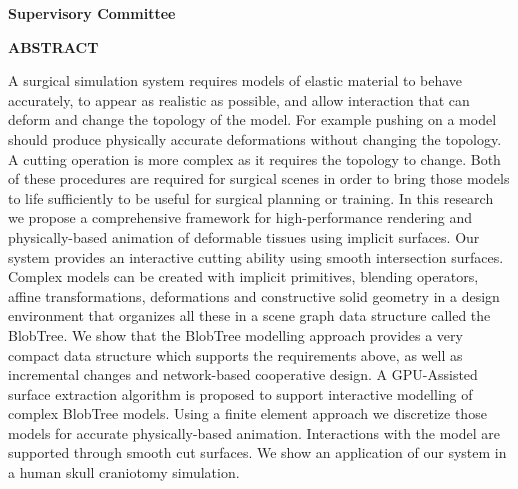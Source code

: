 \pagebreak
\newpage
{}

\noindent \textbf{Supervisory Committee}
\tpbreak
\panel

\begin{center}
\textbf{ABSTRACT}
\end{center}
A surgical simulation system requires models of elastic material to behave 
accurately, to appear as realistic as possible, and allow interaction that can 
deform and change the topology of the model.
 For example pushing on a model  should produce physically accurate deformations without changing the topology. 
 A cutting operation is 
more complex as it requires the  topology to change. Both of these procedures are required 
for surgical scenes in order to bring those models to life sufficiently to be useful for surgical planning or
training.
In this research we propose a comprehensive framework for high-performance rendering
and physically-based animation of deformable  tissues using implicit surfaces.
Our system provides an interactive cutting ability using smooth intersection surfaces.
Complex models can be created with implicit primitives, blending operators, affine
transformations, deformations and constructive solid geometry in a design environment that organizes
all these in a scene graph data structure called the BlobTree. We show that the
BlobTree modelling approach provides a very compact data structure which supports 
the requirements above, as well as incremental changes and network-based cooperative design.
A GPU-Assisted surface extraction algorithm is proposed to support interactive modelling of complex BlobTree models.
Using a finite element approach we discretize those models for accurate physically-based animation. 
Interactions with the model are supported through smooth cut surfaces. We show an application of our
system in a human skull craniotomy simulation.


\pagebreak


